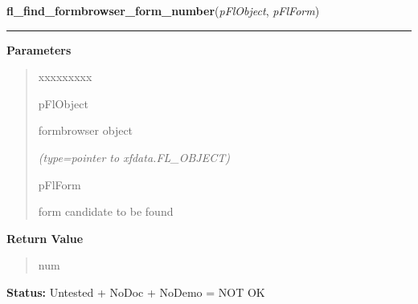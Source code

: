 \hspace{.8\funcindent}\begin{boxedminipage}{\funcwidth}

    \raggedright \textbf{fl\_find\_formbrowser\_form\_number}(\textit{pFlObject}, \textit{pFlForm})

    \vspace{-1.5ex}

    \rule{\textwidth}{0.5\fboxrule}
\setlength{\parskip}{2ex}
\setlength{\parskip}{1ex}
      \textbf{Parameters}
      \vspace{-1ex}

      \begin{quote}
        \begin{Ventry}{xxxxxxxxx}

          \item[pFlObject]

          formbrowser object

            {\it (type=pointer to xfdata.FL\_OBJECT)}

          \item[pFlForm]

          form candidate to be found

        \end{Ventry}

      \end{quote}

      \textbf{Return Value}
    \vspace{-1ex}

      \begin{quote}
      num

      \end{quote}

\textbf{Status:} Untested + NoDoc + NoDemo = NOT OK



    \end{boxedminipage}

    \label{xformslib:flformbrowser:fl_add_formbrowser}

    \vspace{0.5ex}

